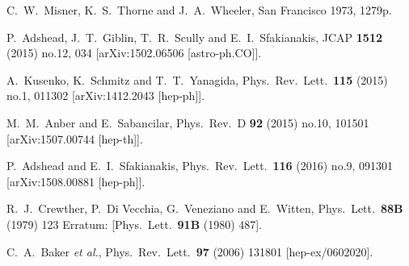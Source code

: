 \begin{thebibliography}{10}
  C.~W.~Misner, K.~S.~Thorne and J.~A.~Wheeler,
  San Francisco 1973, 1279p.


  P.~Adshead, J.~T.~Giblin, T.~R.~Scully and E.~I.~Sfakianakis,
  JCAP {\bf 1512} (2015) no.12,  034
  [arXiv:1502.06506 [astro-ph.CO]].


  A.~Kusenko, K.~Schmitz and T.~T.~Yanagida,
  Phys.\ Rev.\ Lett.\  {\bf 115} (2015) no.1,  011302
  [arXiv:1412.2043 [hep-ph]].


  M.~M.~Anber and E.~Sabancilar,
  Phys.\ Rev.\ D {\bf 92} (2015) no.10,  101501
  [arXiv:1507.00744 [hep-th]].


  P.~Adshead and E.~I.~Sfakianakis,
  Phys.\ Rev.\ Lett.\  {\bf 116} (2016) no.9,  091301
  [arXiv:1508.00881 [hep-ph]].


  R.~J.~Crewther, P.~Di Vecchia, G.~Veneziano and E.~Witten,
  Phys.\ Lett.\  {\bf 88B} (1979) 123
   Erratum: [Phys.\ Lett.\  {\bf 91B} (1980) 487].


  C.~A.~Baker {\it et al.},
  Phys.\ Rev.\ Lett.\  {\bf 97} (2006) 131801
  [hep-ex/0602020].



\end{thebibliography}
